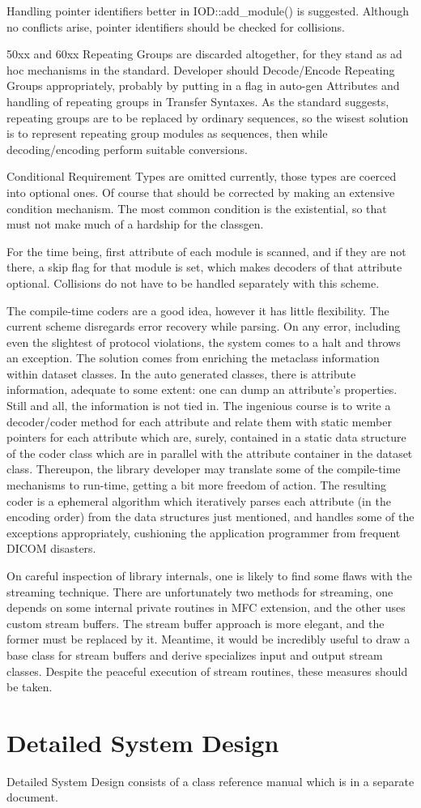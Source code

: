 \documentclass[a4paper,10pt]{article}
\begin{document}
Handling pointer identifiers better in IOD::add{\_}module() is suggested.
Although no conflicts arise, pointer identifiers should be checked for
collisions.

50xx and 60xx Repeating Groups are discarded altogether, for they stand as
ad hoc mechanisms in the standard. Developer should Decode/Encode Repeating
Groups appropriately, probably by putting in a flag in auto-gen Attributes
and handling of repeating groups in Transfer Syntaxes. As the standard
suggests, repeating groups are to be replaced by ordinary sequences, so the
wisest solution is to represent repeating group modules as sequences, then
while decoding/encoding perform suitable conversions.

Conditional Requirement Types are omitted currently, those types are coerced
into optional ones. Of course that should be corrected by making an
extensive condition mechanism. The most common condition is the existential,
so that must not make much of a hardship for the classgen.

For the time being, first attribute of each module is scanned, and if they
are not there, a skip flag for that module is set, which makes decoders of
that attribute optional. Collisions do not have to be handled separately
with this scheme.

The compile-time coders are a good idea, however it has little flexibility.
The current scheme disregards error recovery while parsing. On any error,
including even the slightest of protocol violations, the system comes to a
halt and throws an exception. The solution comes from enriching the
metaclass information within dataset classes. In the auto generated classes,
there is attribute information, adequate to some extent: one can dump an
attribute{'}s properties. Still and all, the information is not tied in. The
ingenious course is to write a decoder/coder method for each attribute and
relate them with static member pointers for each attribute which are,
surely, contained in a static data structure of the coder class which are in
parallel with the attribute container in the dataset class. Thereupon, the
library developer may translate some of the compile-time mechanisms to
run-time, getting a bit more freedom of action. The resulting coder is a
ephemeral algorithm which iteratively parses each attribute (in the encoding
order) from the data structures just mentioned, and handles some of the
exceptions appropriately, cushioning the application programmer from
frequent DICOM disasters.

On careful inspection of library internals, one is likely to find some flaws
with the streaming technique. There are unfortunately two methods for
streaming, one depends on some internal private routines in MFC extension,
and the other uses custom stream buffers. The stream buffer approach is more
elegant, and the former must be replaced by it. Meantime, it would be
incredibly useful to draw a base class for stream buffers and derive
specializes input and output stream classes. Despite the peaceful execution
of stream routines, these measures should be taken.

\section{Detailed System Design}

Detailed System Design consists of a class reference manual which
is in a separate document.
\end{document}
